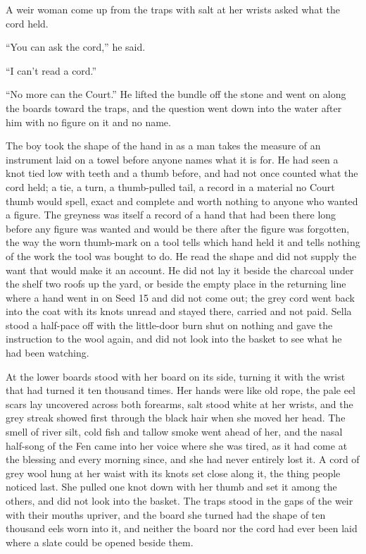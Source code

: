 A weir woman come up from the traps with salt at her wrists asked what the cord held.

“You can ask the cord,” he said.

“I can't read a cord.”

“No more can the Court.” He lifted the bundle off the stone and went on along the boards toward the traps, and the question went down into the water after him with no figure on it and no name.

The boy took the shape of the hand in as a man takes the measure of an instrument laid on a towel before anyone names what it is for. He had seen a knot tied low with teeth and a thumb before, and had not once counted what the cord held; a tie, a turn, a thumb-pulled tail, a record in a material no Court thumb would spell, exact and complete and worth nothing to anyone who wanted a figure. The greyness was itself a record of a hand that had been there long before any figure was wanted and would be there after the figure was forgotten, the way the worn thumb-mark on a tool tells which hand held it and tells nothing of the work the tool was bought to do. He read the shape and did not supply the want that would make it an account. He did not lay it beside the charcoal under the shelf two roofs up the yard, or beside the empty place in the returning line where a hand went in on Seed 15 and did not come out; the grey cord went back into the coat with its knots unread and stayed there, carried and not paid. Sella stood a half-pace off with the little-door burn shut on nothing and gave the instruction to the wool again, and did not look into the basket to see what he had been watching.

\scenebreak

At the lower boards  stood with her board on its side, turning it with the wrist that had turned it ten thousand times. Her hands were like old rope, the pale eel scars lay uncovered across both forearms, salt stood white at her wrists, and the grey streak showed first through the black hair when she moved her head. The smell of river silt, cold fish and tallow smoke went ahead of her, and the nasal half-song of the Fen came into her voice where she was tired, as it had come at the blessing and every morning since, and she had never entirely lost it. A cord of grey wool hung at her waist with its knots set close along it, the thing people noticed last. She pulled one knot down with her thumb and set it among the others, and did not look into the basket. The traps stood in the gaps of the weir with their mouths upriver, and the board she turned had the shape of ten thousand eels worn into it, and neither the board nor the cord had ever been laid where a slate could be opened beside them.

